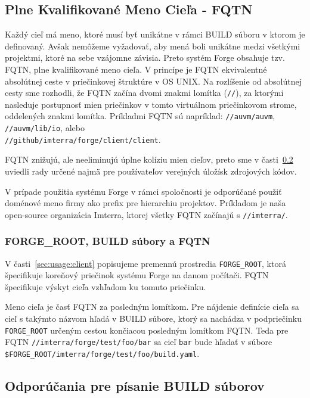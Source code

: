 \subsection{Plne Kvalifikovan\'{e} Meno Cie\v{l}a - FQTN}
\label{sec:buildfiles:fqtn}

Každý cieľ má meno, ktoré musí byť unikátne v rámci BUILD súboru v ktorom je definovaný.
Avšak nemôžeme vyžadovať, aby mená boli unikátne medzi všetkými projektmi, ktoré na
sebe vzájomne závisia. Preto systém Forge obsahuje tzv. FQTN, plne kvalifikované meno
cieľa. V princípe je FQTN ekvivalentné absolútnej ceste v priečinkovej štruktúre v OS UNIX\@.
Na rozlíšenie od absolútnej cesty sme rozhodli, že FQTN začína dvomi znakmi lomítka (\texttt{//}),
za ktorými nasleduje postupnosť mien priečinkov v tomto virtuálnom priečinkovom strome, oddelených
znakmi lomítka. Príkladmi FQTN sú napríklad: \texttt{//auvm/auvm}, \texttt{//auvm/lib/io}, alebo \\
\texttt{//github/imterra/forge/client/client}.

FQTN znižujú, ale neeliminujú úplne kolíziu mien cieľov, preto sme v časti~\ref{sec:buildfiles:bestpractices}
uviedli rady určené najmä pre používateľov verejných úložísk zdrojových kódov.

V prípade použitia systému Forge v rámci spoločnosti je odporúčané použiť doménové meno firmy
ako prefix pre hierarchiu projektov. Príkladom je naša open-source organizácia Imterra, ktorej všetky
FQTN začínajú s \texttt{//imterra/}.

\subsubsection{FORGE\_ROOT, BUILD súbory a FQTN}

V časti~\ref{sec:usage:client} popisujeme premennú prostredia \texttt{FORGE\_ROOT}, ktorá
špecifikuje koreňový priečinok systému Forge na danom počítači. FQTN špecifikuje výskyt
cieľa vzhľadom ku tomuto priečinku.

Meno cieľa je časť FQTN za posledným lomítkom. Pre nájdenie definície cieľa sa cieľ
s takýmto názvom hľadá v BUILD súbore, ktorý sa nachádza v podpriečinku \texttt{FORGE\_ROOT}
určeným cestou končiacou posledným lomítkom FQTN\@. Teda pre FQTN \texttt{//imterra/forge/test/foo/bar}
sa cieľ \texttt{bar} bude hľadať v súbore \\
\texttt{\$FORGE\_ROOT/imterra/forge/test/foo/build.yaml}.

\subsection{Odpor\'{u}\v{c}ania pre p\'{i}sanie BUILD s\'{u}borov}
\label{sec:buildfiles:bestpractices}

